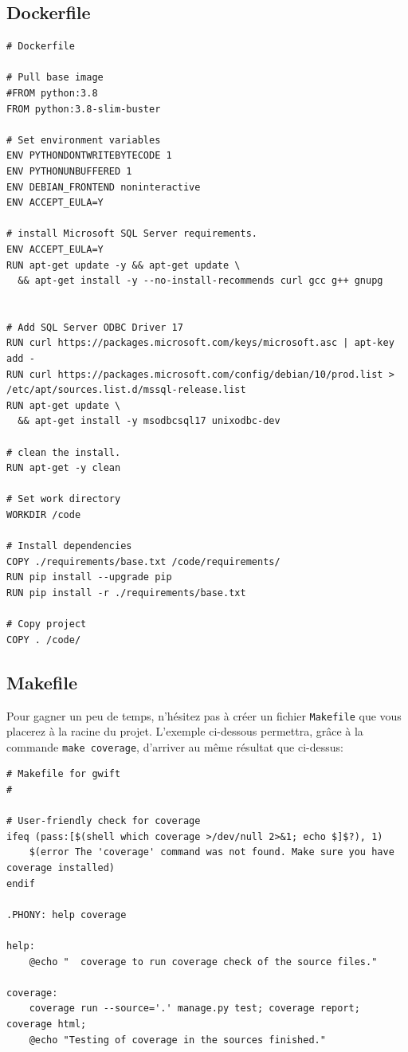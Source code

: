 \documentclass[11pt]{amsbook}
\begin{document}
\hypertarget{x-dockerfile}{\subsection{Dockerfile}}
\begin{verbatim}
# Dockerfile

# Pull base image
#FROM python:3.8
FROM python:3.8-slim-buster

# Set environment variables
ENV PYTHONDONTWRITEBYTECODE 1
ENV PYTHONUNBUFFERED 1
ENV DEBIAN_FRONTEND noninteractive
ENV ACCEPT_EULA=Y

# install Microsoft SQL Server requirements.
ENV ACCEPT_EULA=Y
RUN apt-get update -y && apt-get update \
  && apt-get install -y --no-install-recommends curl gcc g++ gnupg


# Add SQL Server ODBC Driver 17
RUN curl https://packages.microsoft.com/keys/microsoft.asc | apt-key add -
RUN curl https://packages.microsoft.com/config/debian/10/prod.list > /etc/apt/sources.list.d/mssql-release.list
RUN apt-get update \
  && apt-get install -y msodbcsql17 unixodbc-dev

# clean the install.
RUN apt-get -y clean

# Set work directory
WORKDIR /code

# Install dependencies
COPY ./requirements/base.txt /code/requirements/
RUN pip install --upgrade pip
RUN pip install -r ./requirements/base.txt

# Copy project
COPY . /code/
\end{verbatim}

\hypertarget{x-makefile}{\subsection{Makefile}}
Pour gagner un peu de temps, n’hésitez pas à créer un fichier \texttt{Makefile} que vous placerez à la racine du projet.
L’exemple ci-dessous permettra, grâce à la commande \texttt{make coverage}, d’arriver au même résultat que ci-dessus:


\begin{verbatim}
# Makefile for gwift
#

# User-friendly check for coverage
ifeq (pass:[$(shell which coverage >/dev/null 2>&1; echo $]$?), 1)
    $(error The 'coverage' command was not found. Make sure you have coverage installed)
endif

.PHONY: help coverage

help:
    @echo "  coverage to run coverage check of the source files."

coverage:
    coverage run --source='.' manage.py test; coverage report; coverage html;
    @echo "Testing of coverage in the sources finished."
\end{verbatim}
\end{document}
